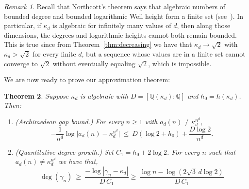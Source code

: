 \documentclass{article}
\theoremstyle{plain}
\newtheorem{theorem}{Theorem}[section]
\theoremstyle{definition}
\theoremstyle{remark}
\newtheorem{remark}[theorem]{Remark}
\newcommand{\Q}{\mathbb{Q}}
\begin{document}
\begin{remark}
Recall that Northcott's theorem says that algebraic numbers of bounded degree and bounded logarithmic Weil height form a finite set (see~\cite{Northcott1949}). In particular, if $\kappa_d$ is algebraic for infinitely many values of $d$, then along those dimensions, the degrees and logarithmic heights cannot both remain bounded. This is true since from  Theorem~\ref{thm:decreasing} we have that $\kappa_d\to\sqrt2$ with $\kappa_d>\sqrt2$ for every finite $d$, but a sequence whose values are in a finite set cannot converge to $\sqrt2$ without eventually equaling $\sqrt2$, which is impossible.
\end{remark}

We are now ready to prove our approximation theorem:

\begin{theorem}\label{thm:master}
Suppose $\kappa_d$ is algebraic with $D=[\Q(\kappa_d):\Q]$ and $h_0=h(\kappa_d)$. Then:
\begin{enumerate}
\item  \textup{(Archimedean gap bound.)} For every $n\ge1$ with $a_d(n)\ne\kappa_d^{n^d}$,
\[
-\frac1{n^d}\log\big|a_d(n)-\kappa_d^{n^d}\big|\ \le\ D(\log2+h_0)+\frac{D\log2}{n^d}.
\]
\item \textup{(Quantitative degree growth.)} Set $C_1=h_0+2\log2$. For every $n$ such that $a_d(n)\ne\kappa_d^{n^d}$ we have that,
\[
\deg(\gamma_n)\ \ge\ \frac{-\log|\gamma_n-\kappa_d|}{D\,C_1} \ge\ \frac{\log n - \log(2\sqrt3\,d\log2)}{D\,C_1}
\]
\end{enumerate}
\end{theorem}
\end{document}
